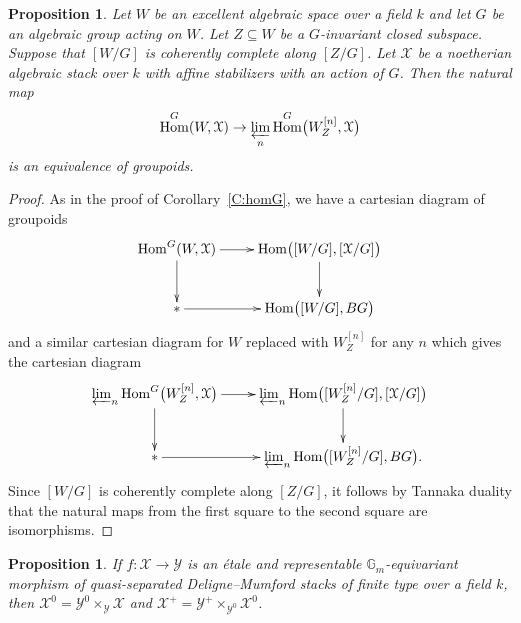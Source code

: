 \documentclass[a4paper]{amsart}
\theoremstyle{plain}
\newtheorem{proposition}[theorem]{Proposition}
\theoremstyle{definition}
\theoremstyle{remark}
\numberwithin{equation}{section}
\newcommand{\GG}{\mathbb{G}}
\newcommand\cX{\mathcal{X}}
\newcommand\cY{\mathcal{Y}}
\newcommand\co{\colon}
\newcommand{\ilim}{\varprojlim}
\DeclareMathOperator{\Hom}{Hom}
\begin{document}
\begin{proposition} \label{P:tannakian2}
Let $W$ be an excellent algebraic space over a field $k$ and let $G$ be an algebraic group acting on $W$.  Let $Z \subseteq W$ be a $G$-invariant closed subspace. Suppose that $[W/G]$ is coherently complete along $[Z/G]$.  Let $\cX$ be a noetherian algebraic stack over $k$ with affine stabilizers with an action of $G$.
Then the natural map
$$
\Hom^{G}(W, \cX) \to \ilim_n \Hom^{G}\bigl(W_Z^{[n]}, \cX\bigr)
$$
is an equivalence of groupoids.
\end{proposition}

\begin{proof}
As in the proof of Corollary~\ref{C:homG}, we have a cartesian diagram of groupoids
\[
\xymatrix{
  \Hom^G(W,\cX)\ar[r]\ar[d] & \Hom\bigl([W/G],[\cX/G]\bigr)\ar[d] \\
  {*}\ar[r] & \Hom\bigl([W/G],BG\bigr)
}
\]
and a similar cartesian diagram for $W$ replaced with $W_Z^{[n]}$ for any $n$ which gives the cartesian diagram
\[
\xymatrix{
  \ilim_n \Hom^G\bigl(W_Z^{[n]},\cX\bigr)\ar[r]\ar[d] & \ilim_n \Hom\bigl([W_Z^{[n]}/G],[\cX/G]\bigr)\ar[d] \\
  {*}\ar[r] & \ilim_n \Hom\bigl([W_Z^{[n]}/G],BG\bigr).
}
\]
Since $[W/G]$ is coherently complete along $[Z/G]$, it follows by Tannaka duality that the natural maps from the first square to the
second square are isomorphisms.
\end{proof}

\begin{proposition} \label{P:drinfeld-base-change} 
	If $f \co \cX \to \cY$ is an \'etale and representable $\GG_m$-equivariant morphism of quasi-separated Deligne--Mumford stacks of finite type over a field $k$, then
	$\cX^0 = \cY^0 \times_{\cY} \cX$ and $\cX^+ = \cY^+ \times_{\cY^0} \cX^0$.
\end{proposition}
\end{document}
